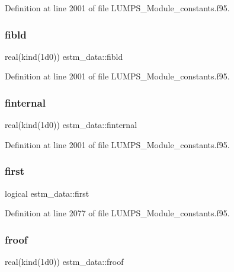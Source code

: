 Definition at line 2001 of file L\+U\+M\+P\+S\+\_\+\+Module\+\_\+constants.\+f95.

\mbox{\label{namespaceestm__data_a7d50043d64fcdfb8c7d6ad60d17cf899}} 
\subsubsection{\texorpdfstring{fibld}{fibld}}
{\footnotesize\ttfamily real(kind(1d0)) estm\+\_\+data\+::fibld}



Definition at line 2001 of file L\+U\+M\+P\+S\+\_\+\+Module\+\_\+constants.\+f95.

\mbox{\label{namespaceestm__data_ab51560756cfb7c322c529a79e60c1e41}} 
\subsubsection{\texorpdfstring{finternal}{finternal}}
{\footnotesize\ttfamily real(kind(1d0)) estm\+\_\+data\+::finternal}



Definition at line 2001 of file L\+U\+M\+P\+S\+\_\+\+Module\+\_\+constants.\+f95.

\mbox{\label{namespaceestm__data_a24d84ca68dce8c57c22e0d7861609274}} 
\subsubsection{\texorpdfstring{first}{first}}
{\footnotesize\ttfamily logical estm\+\_\+data\+::first}



Definition at line 2077 of file L\+U\+M\+P\+S\+\_\+\+Module\+\_\+constants.\+f95.

\mbox{\label{namespaceestm__data_a1fd10be127e3b3f05b97d60a4942f5b9}} 
\subsubsection{\texorpdfstring{froof}{froof}}
{\footnotesize\ttfamily real(kind(1d0)) estm\+\_\+data\+::froof}



